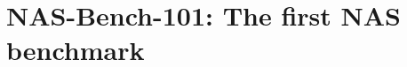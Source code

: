 \renewcommand{\lecturetitle}{NAS-Bench-101: The first NAS benchmark}
\renewcommand{\lecturetime}{Week 9, Video 4}
\section{\lecturetitle}

